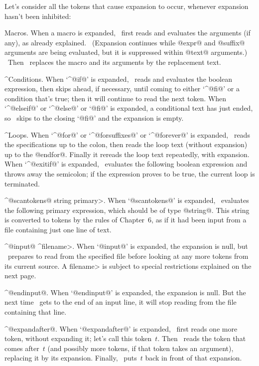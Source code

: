 \ddanger Let's consider all the tokens that cause expansion to occur,
whenever expansion hasn't been inhibited:\enddanger

\nobreak\medskip
\textindent\bull Macros. When a macro is expanded, \MF\ first reads and
evaluates the arguments (if any), as already explained.
\ (Expansion continues while @expr@ and @suffix@ arguments are
being evaluated, but it is suppressed within @text@ arguments.) \
Then \MF\ replaces the macro and its arguments by the replacement text.

\smallbreak
\textindent\bull ^{Conditions}. When `^@if@\kern1pt' is expanded, \MF\
reads and evaluates the boolean expression, then skips ahead, if necessary,
until coming to either `^@fi@' or a condition that's true; then it will
continue to read the next token. When `^@elseif@\kern1pt' or `^@else@'
or `@fi@' is expanded, a conditional text has just ended, so \MF\
skips to the closing `@fi@' and the expansion is empty.

\smallbreak
\textindent\bull ^{Loops}. When `^@for@' or `^@forsuffixes@' or
`^@forever@' is expanded, \MF\ reads the specifications up to the colon,
then reads the loop text (without expansion) up to the @endfor@.
Finally it rereads the loop text repeatedly, with expansion. When
`^@exitif@\kern1pt' is expanded, \MF\ evaluates the following boolean
expression and throws away the semicolon; if the expression proves
to be true, the current loop is terminated.

\smallbreak
\textindent\bull ^@scantokens@ \<string primary>. When `@scantokens@'
is expanded, \MF\ evaluates the following primary expression, which
should be of type @string@. This string is converted to tokens by the
rules of Chapter~6, as if
it had been input from a file containing just one line of text.

\smallbreak
\textindent\bull ^@input@ ^\<filename>. When `@input@' is expanded,
the expansion is null, but \MF\ prepares to read from the specified
file before looking at any more tokens from its current source.
A \<filename> is subject to special restrictions explained on the
next page.

\smallbreak
\textindent\bull ^@endinput@. When `@endinput@' is expanded, the
expansion is null. But the next time \MF\ gets to the end of an
input line, it will stop reading from the file containing that line.

\smallbreak
\textindent\bull ^@expandafter@. When `@expandafter@' is expanded,
\MF\ first reads one more token, without expanding it; let's
call this token~$t$. Then \MF\ reads the token that comes after~$t$
(and possibly more tokens, if that token takes an argument),
replacing it by its expansion. Finally, \MF\ puts~$t$ back in front
of that expansion.

